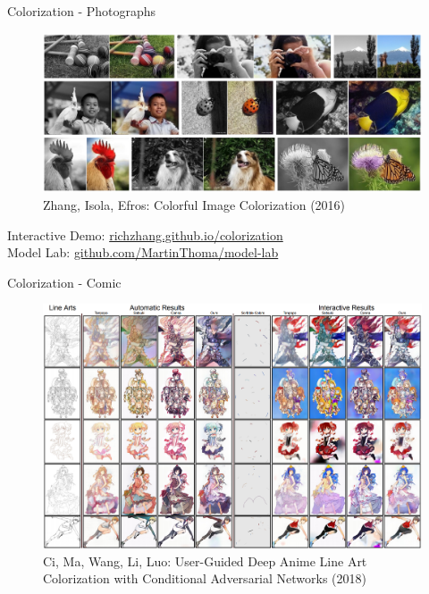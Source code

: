 \documentclass{beamer}
\begin{document}
\begin{frame}{Colorization - Photographs}
\begin{figure}[ht]
    \centering
    \includegraphics[width=0.8\paperwidth, height=0.7\paperheight, keepaspectratio]{graphics/colorful-image-colorization.png}
    \captionsetup{labelformat=empty}
    \caption{Zhang, Isola, Efros: Colorful Image Colorization (2016)}
\end{figure}

Interactive Demo: \href{http://richzhang.github.io/colorization/}{richzhang.github.io/colorization}\\
Model Lab: \href{https://github.com/MartinThoma/model-lab}{github.com/MartinThoma/model-lab}
\end{frame}


\begin{frame}{Colorization - Comic}
\begin{figure}[ht]
    \centering
    \includegraphics[width=0.8\paperwidth, height=0.7\paperheight, keepaspectratio]{graphics/comic-colorization.png}
    \captionsetup{labelformat=empty}
    \caption{Ci, Ma, Wang, Li, Luo: User-Guided Deep Anime Line Art Colorization with Conditional Adversarial Networks (2018)}
\end{figure}
\end{frame}
\end{document}
